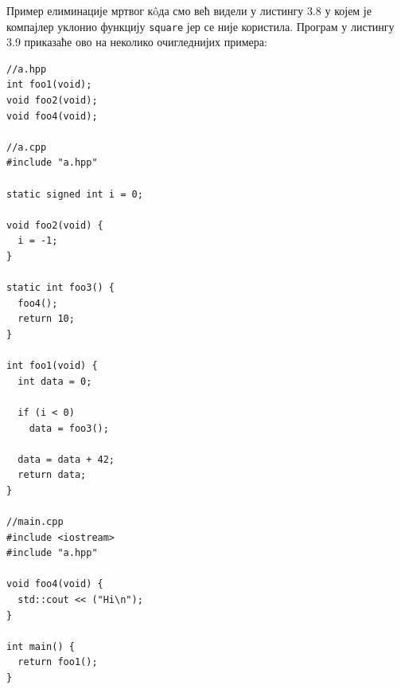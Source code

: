 \documentclass[12pt,oneside]{memoir}
\begin{document}
Пример елиминације мртвог к\^{o}да смо већ видели у листингу 3.8
у којем је компајлер уклонио функцију \texttt{square} јер се није користила. Програм
у листингу 3.9 приказаће ово на неколико очигледнијих примера:

\begin{lstlisting}[frame=single,caption={Primer eliminacije mrtvog koda}, captionpos=b]
//a.hpp
int foo1(void);
void foo2(void);
void foo4(void);

//a.cpp
#include "a.hpp"

static signed int i = 0;

void foo2(void) {
  i = -1;
}

static int foo3() {
  foo4();
  return 10;
}

int foo1(void) {
  int data = 0;

  if (i < 0)
    data = foo3();

  data = data + 42;
  return data;
}

//main.cpp
#include <iostream>
#include "a.hpp"

void foo4(void) {
  std::cout << ("Hi\n");
}

int main() {
  return foo1();
}

\end{lstlisting}
\end{document}
